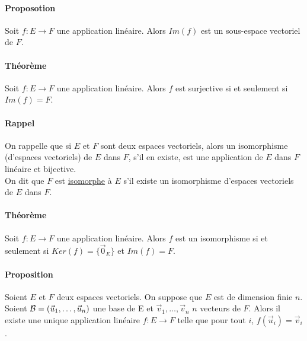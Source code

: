 \paragraph{Proposotion} Soit $f: E \rightarrow F$ une application linéaire. Alors $Im(f)$ est un sous-espace vectoriel de $F$.


\paragraph{Théorème} Soit $f: E \rightarrow F$  une application linéaire. Alors $f$ est surjective si et seulement si $Im(f) = F$.

\paragraph{Rappel} On rappelle que si $E$ et $F$ sont deux espaces vectoriels, alors un isomorphisme (d'espaces vectoriels) de $E$ dans $F$, s'il en existe, est une application de $E$ dans $F$ linéaire et bijective. \\
On dit que $F$ est \underline{isomorphe} à $E$ s'il existe un isomorphisme d'espaces vectoriels de $E$ dans $F$.

\paragraph{Théorème} Soit $f: E \rightarrow F$  une application linéaire. Alors $f$ est un isomorphisme si et seulement si $Ker(f) = \{\vec{0}_E\}$ et $Im(f) = F$.

\paragraph{Proposition} Soient $E$ et $F$ deux espaces vectoriels. On suppose que $E$ est de dimension finie $n$. Soient $\mathcal{B} = (\vec{u}_1, \ldots, \vec{u}_n)$ une base de E et $\vec{v}_1, \ldots, \vec{v}_n$ $n$ vecteurs de $F$. Alors il existe une unique application linéaire $f: E \rightarrow F$ telle que pour tout $i$, $f(\vec{u}_i) = \vec{v}_i$.

